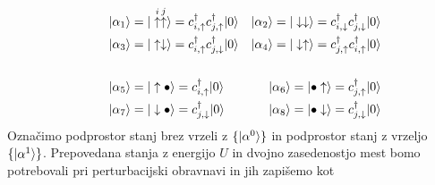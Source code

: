 \begin{appendices}
\begin{equation}\label{eq:stanja}
\begin{aligned}\qquad
&\vert\alpha_1\rangle= \vert  \overset{i}{\uparrow} \overset{j}{\uparrow}\rangle=c^\dagger_{i,\uparrow}c^\dagger_{j,\uparrow}\vert0\rangle & \vert\alpha_2\rangle=\vert \downarrow \downarrow\rangle=c^\dagger_{i,\downarrow}c^\dagger_{j,\downarrow}\vert0\rangle\\
&\vert\alpha_3\rangle=\vert \uparrow \downarrow \rangle=c^\dagger_{i,\uparrow}c^\dagger_{j,\downarrow}\vert0\rangle &\vert\alpha_4\rangle=\vert \downarrow \uparrow \rangle=c^\dagger_{j,\uparrow}c^\dagger_{i,\uparrow}\vert0\rangle \\\\
&\vert\alpha_5\rangle= \vert\uparrow \bullet\rangle=c^\dagger_{i,\uparrow}\vert0\rangle &\vert\alpha_6\rangle=\vert \bullet  \uparrow\rangle=c^\dagger_{j,\uparrow}\vert0\rangle\\
&\vert\alpha_7\rangle=\vert\downarrow \bullet\rangle=c^\dagger_{j,\downarrow}\vert0\rangle&\vert\alpha_8\rangle=\vert \bullet  \downarrow \rangle=c^\dagger_{j,\downarrow}\vert0\rangle\\
\end{aligned}
\end{equation}
Označimo podprostor stanj brez vrzeli z $\{ \vert\alpha^0\rangle\}$ in podprostor stanj z vrzeljo $\{ \vert\alpha^1\rangle\}$.
Prepovedana stanja z energijo $U$ in dvojno zasedenostjo mest bomo potrebovali pri perturbacijski obravnavi in jih zapišemo  kot 
\begin{equation}\label{eq:vzbujena}

\end{equation}
\end{appendices}
